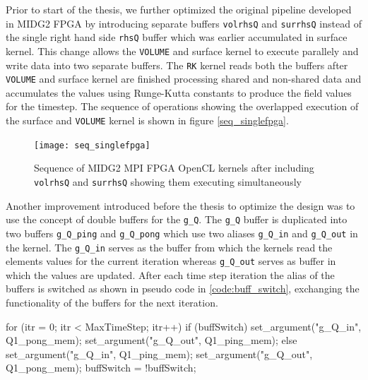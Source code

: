 Prior to start of the thesis, we further optimized the original pipeline developed in MIDG2 FPGA
by introducing separate buffers \texttt{volrhsQ} and \texttt{surrhsQ} instead of the single
right hand side \texttt{rhsQ} buffer which was earlier accumulated in surface kernel.
This change allows the \texttt{VOLUME} and surface kernel to execute parallely and write data into
two separate buffers. The \texttt{RK} kernel reads both the buffers after \texttt{VOLUME} and surface kernel
are finished processing shared and non-shared data and accumulates the values using Runge-Kutta
constants to produce the field values for the timestep. The sequence of operations
showing the overlapped execution of the surface and \texttt{VOLUME} kernel is shown in figure \ref{seq_singlefpga}.

\begin{figure}[ht]%
    \centering
    \texttt{[image: seq\_singlefpga]}
    \caption{Sequence of MIDG2 MPI FPGA OpenCL kernels after including \texttt{volrhsQ} and \texttt{surrhsQ}
    showing them executing simultaneously}
    \label{fig:seq_singlefpga}
\end{figure}

Another improvement introduced before the thesis
to optimize the design was to use the concept of double buffers for the \texttt{g\_Q}.
The \texttt{g\_Q} buffer is duplicated into two buffers \texttt{g\_Q\_ping} and \texttt{g\_Q\_pong}
which use two aliases \texttt{g\_Q\_in} and \texttt{g\_Q\_out} in the kernel. The \texttt{g\_Q\_in}
serves as the buffer from which the kernels read the elements values for the current iteration whereas
\texttt{g\_Q\_out} serves as buffer in which the values
are updated. After each time step iteration the alias of the buffers is switched as shown
in pseudo code in \ref{code:buff_switch}, exchanging the functionality of the buffers for the next iteration.
\begin{CppCode}[caption=Buffer switching for double buffers in each iteration, frame=tlrb, label=code:buff_switch]
for (itr = 0; itr < MaxTimeStep; itr++)
{
    if (buffSwitch)
    {
        set_argument("g_Q_in", Q1_pong_mem);
        set_argument("g_Q_out", Q1_ping_mem);
    }
    else
    {
        set_argument("g_Q_in", Q1_ping_mem);
        set_argument("g_Q_out", Q1_pong_mem);
    }
    buffSwitch = !buffSwitch;
}
\end{CppCode}

